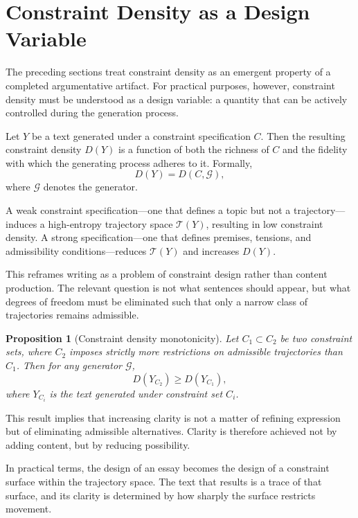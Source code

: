 \documentclass[12pt, oneside]{article}
\theoremstyle{plain}
\newtheorem{proposition}[theorem]{Proposition}
\theoremstyle{definition}
\theoremstyle{remark}
\begin{document}
\section{Constraint Density as a Design Variable}

The preceding sections treat constraint density as an emergent property of a
completed argumentative artifact. For practical purposes, however, constraint
density must be understood as a design variable: a quantity that can be actively
controlled during the generation process.

Let $Y$ be a text generated under a constraint specification $C$. Then the
resulting constraint density $D(Y)$ is a function of both the richness of $C$
and the fidelity with which the generating process adheres to it. Formally,
\[
  D(Y) = D(C, \mathcal{G}),
\]
where $\mathcal{G}$ denotes the generator.

A weak constraint specification---one that defines a topic but not a trajectory---induces
a high-entropy trajectory space $\mathcal{T}(Y)$, resulting in low constraint density.
A strong specification---one that defines premises, tensions, and admissibility
conditions---reduces $\mathcal{T}(Y)$ and increases $D(Y)$.

This reframes writing as a problem of constraint design rather than content production.
The relevant question is not what sentences should appear, but what degrees of freedom
must be eliminated such that only a narrow class of trajectories remains admissible.

\begin{proposition}[Constraint density monotonicity]
Let $C_1 \subset C_2$ be two constraint sets, where $C_2$ imposes strictly more
restrictions on admissible trajectories than $C_1$. Then for any generator $\mathcal{G}$,
\[
  D(Y_{C_2}) \geq D(Y_{C_1}),
\]
where $Y_{C_i}$ is the text generated under constraint set $C_i$.
\end{proposition}

This result implies that increasing clarity is not a matter of refining expression
but of eliminating admissible alternatives. Clarity is therefore achieved not by
adding content, but by reducing possibility.

In practical terms, the design of an essay becomes the design of a constraint surface
within the trajectory space. The text that results is a trace of that surface, and
its clarity is determined by how sharply the surface restricts movement.
\end{document}
